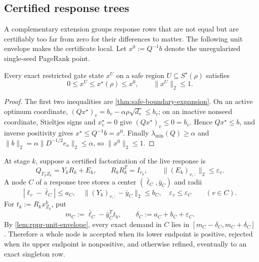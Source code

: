 \subsection{Certified response trees}
\label{sec:certified-response-trees}

A complementary extension groups response rows that are not equal but are
certifiably too far from zero for their differences to matter.  The following
unit envelope makes the certificate local.  Let $x^0:=Q^{-1}b$ denote the
unregularized single-seed PageRank point.

\begin{lemma}
\label{lem:rppr-unit-envelope}
Every exact restricted gate state $x^U$ on a safe region
$U\subseteq S^\star(\rho)$ satisfies
\begin{equation}
 0\leq x^U\leq x^\star(\rho)\leq x^0,
 \qquad
 \|x^U\|_2\leq1.
 \label{eq:rppr-unit-envelope}
\end{equation}
\end{lemma}

\begin{proof}
The first two inequalities are \cref{thm:safe-boundary-expansion}.  On an
active optimum coordinate, $(Qx^\star)_v=b_v-\alpha\rho\sqrt{d_v}\leq b_v$;
on an inactive nonseed coordinate, Stieltjes signs and $x_v^\star=0$ give
$(Qx^\star)_v\leq0=b_v$.  Hence $Qx^\star\leq b$, and inverse positivity
gives $x^\star\leq Q^{-1}b=x^0$.  Finally
$\lambda_{\min}(Q)\geq\alpha$ and
$\|b\|_2=\alpha\|D^{-1/2}e_o\|_2\leq\alpha$, so
$\|x^0\|_2\leq1$.
\end{proof}

At stage $k$, suppose a certified factorization of the live response is
\begin{equation}
 Q_{\Gamma_kZ_k}=Y_kR_k+E_k,
 \qquad R_kR_k^T=I_{r_k},
 \qquad \|(E_k)_{v,:}\|_2\leq\varepsilon_v.
 \label{eq:certified-response-factor}
\end{equation}
A node $C$ of a response tree stores a center
$(\bar\ell_C,\bar y_C)$ and radii
\begin{equation}
 |\ell_v-\bar\ell_C|\leq a_C,
 \quad \|(Y_k)_{v,:}-\bar y_C\|_2\leq b_C,
 \quad \varepsilon_v\leq\varepsilon_C
 \qquad(v\in C).
 \label{eq:response-cluster-radii}
\end{equation}
For $t_k:=R_kx^k_{Z_k}$, put
\begin{equation}
 m_C:=\bar\ell_C-\bar y_C^Tt_k,
 \qquad \delta_C:=a_C+b_C+\varepsilon_C.
 \label{eq:response-cluster-interval}
\end{equation}
By \cref{lem:rppr-unit-envelope}, every exact demand in $C$ lies in
$[m_C-\delta_C,m_C+\delta_C]$.  Therefore a whole node is accepted when its
lower endpoint is positive, rejected when its upper endpoint is nonpositive,
and otherwise refined, eventually to an exact singleton row.

